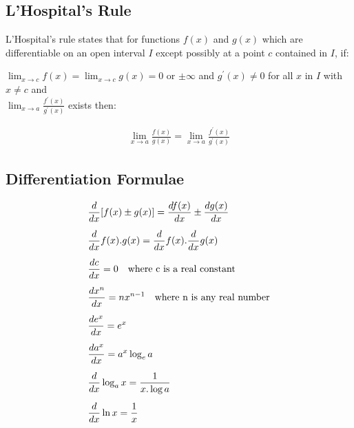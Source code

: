 \subsection{L'Hospital's Rule}
L'Hospital's rule states that for functions $f(x)$ and $g(x)$ which are differentiable on an open interval $I$ except possibly at a point $c$ contained in $I$, if:

\vspace{3mm}

\noindent
$ \lim_{x \to c} f(x) = \lim_{x \to c} g(x) = 0$ or $\pm \infty $ and $g^{'}(x)\neq 0$ for all $x$ in $I$ with $x \neq c$ and \\

\noindent
$\lim_{x \to a} \frac{f^{'}(x)}{g^{'}(x)}$ exists then:

\vspace{3mm}

\begin{tcolorbox}
\begin{center}
\begin{align*}
\lim_{x \to a} \frac{f(x)}{g(x)} = \lim_{x \to a} \frac{f^{'}(x)}{g^{'}(x)}
\end{align*}
\end{center}
\end{tcolorbox} 

\vspace{2mm}

\subsection{Differentiation Formulae}
\vspace{-2mm}
\begin{align*}
&\frac{d}{dx}[f(x) \pm g(x)] = \frac{df(x)}{dx} \pm\frac{dg(x)}{dx}\\[5pt]
&\frac{d}{dx}f(x).g(x) = \frac{d}{dx}f(x).\frac{d}{dx}g(x)\\[5pt]
&\frac{dc}{dx} = 0 \quad \text{where c is a real constant} \\[5pt]
&\frac{d x^n}{dx} = nx^{n-1} \quad \text{where n is any real number}\\[5pt]
\vspace{5mm}
&\frac{de^x}{dx} = e^x \\[5pt]
&\frac{da^x}{dx} = a^x\log_{e}a \\[5pt]
&\frac{d}{dx}\log_a x = \frac{1}{x. \log a} \\[5pt]
&\frac{d}{dx}\ln x = \frac{1}{x}
\end{align*}

